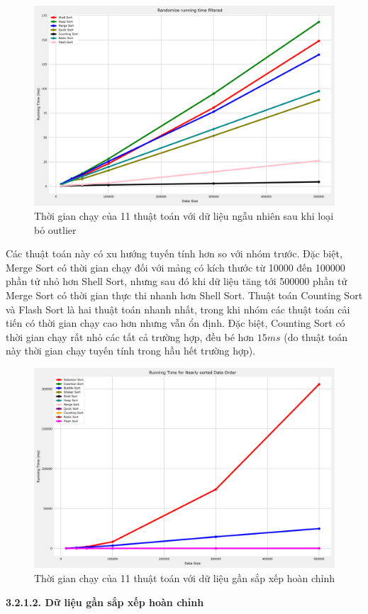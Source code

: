 \begin{figure}[H]
    \centering
    \includegraphics[width=\textwidth]{experimental_result/images/randomize_running_time_filtered.png}
    \caption{Thời gian chạy của 11 thuật toán với dữ liệu ngẫu nhiên sau khi loại bỏ outlier}
    \label{fig:randomize_running_time_filtered}
\end{figure}

Các thuật toán này có xu hướng tuyến tính hơn so với nhóm trước. Đặc biệt, Merge Sort có thời gian chạy đối với mảng có kích thước từ 10000 đến 100000 phần tử nhỏ hơn Shell Sort, nhưng sau đó khi dữ liệu tăng tới 500000 phần tử Merge Sort có thời gian thực thi nhanh hơn Shell Sort. Thuật toán Counting Sort và Flash Sort là hai thuật toán nhanh nhất, trong khi nhóm các thuật toán cải tiến có thời gian chạy cao hơn nhưng vẫn ổn định. Đặc biệt, Counting Sort có thời gian chạy rất nhỏ các tất cả trường hợp, đều bé hơn $15 ms$ (do thuật toán này thời gian chạy tuyến tính trong hầu hết trường hợp).



\begin{figure}[H]
    \centering
    \includegraphics[width=\textwidth]{experimental_result/images/nearly_sorted_running_time.png}
    \caption{Thời gian chạy của 11 thuật toán với dữ liệu gần sắp xếp hoàn chỉnh}
    \label{fig:nearly_sorted_running_time}
\end{figure}
\textbf{3.2.1.2. Dữ liệu gần sắp xếp hoàn chỉnh}


